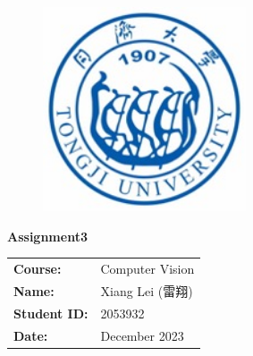 \documentclass[12pt, a4paper, UTF8, fontset=windows]{ctexbook}
\begin{document}
\cfoot{\thepage\ / \pageref{LastPage}} %

\thispagestyle{empty}

\begin{figure}[t]
    \centering
    \includegraphics[width=6cm]{../../src/images/logo.jpg}
\end{figure}

\vspace*{\fill}
    \begin{center}
        \Huge\textbf{Assignment3}
    \end{center}
\vspace*{\fill}

\begin{table}[b]
    \centering
    \large
    \begin{tabular}{ll}
        \textbf{Course:} & Computer Vision \\
        \textbf{Name:} & Xiang Lei (雷翔) \\
        \textbf{Student ID:} & 2053932 \\
        \textbf{Date:} & December 2023 \\
    \end{tabular}
\end{table}

\newpage

\setcounter{page}{1} %
\end{document}
